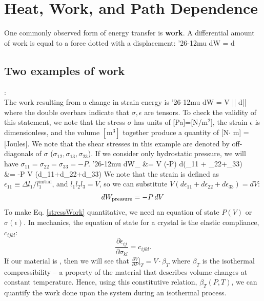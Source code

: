 \documentclass[12pt]{article}
\def\dbar{{\mathchar'26\mkern-12mu d}}
\begin{document}

\section{Heat, Work, and Path Dependence}
One commonly observed form of energy transfer is \textbf{work}. A differential amount of work is equal to a force dotted with a displacement:
\eqs
\dbar W =  \cdot d
\eqe
\subsection{Two examples of work}
: \\
The work resulting from a change in strain energy is 
\eqs
\dbar W = V \bar{\bar{\sigma}} \cdot d\bar{\bar{\epsilon}}
\eqe 
where the double overbars indicate that $\sigma, \epsilon$ are tensors.  To check the validity of this statement, we note that the stress $\sigma$ has units of [Pa]=[N/$\text{m}^2$], the strain $\epsilon$ is dimensionless, and the volume $[\text{m}^3]$ together produce a quantity of [N$\cdot$ m] = [Joules]. We note that the shear stresses in this example are denoted by off-diagonals of $\sigma$ ($\sigma_{12}, \sigma_{13}, \sigma_{23}$).  If we consider only hydrostatic pressure, we will have $\sigma_{11}=\sigma_{22}=\sigma_{33}=-P$.
\eqs
\dbar W_ &= V \cdot (-P) d(\epsilon_{11} + \epsilon_{22}+\epsilon_{33})\\
&= -P V (d\epsilon_{11}+d\epsilon_{22}+d\epsilon_{33})
\eqe
We note that the strain is defined as $\epsilon_{11} \equiv \Delta l_1 / l_1^{\text{initial}}$, and $l_1 l_2 l_3 = V$, so we can substitute $V (d\epsilon_{11}+d\epsilon_{22}+d\epsilon_{33}) = dV$:
\begin{equation}
\dbar W_\text{pressure} = -P \, dV \label{stressWork}
\end{equation}
To make Eq. \ref{stressWork} quantitative, we need an equation of state $P(V)$ or $\sigma(\epsilon)$. In mechanics, the equation of state for a crystal is the elastic compliance, $c_{ijkl}$:
\begin{equation}
\frac{\partial \epsilon_{ij}}{\partial \sigma_{kl}} = c_{ijkl}.
\end{equation}
If our material is , then we will see that $\frac{\partial V}{\partial P}|_T = V \cdot \beta_T$ where $\beta_T$ is the isothermal compressibility -- a property of the material that describes volume changes at constant temperature. Hence, using this constitutive relation, $\beta_T(P,T)$, we can quantify the work done upon the system during an isothermal process. \\
\end{document}

